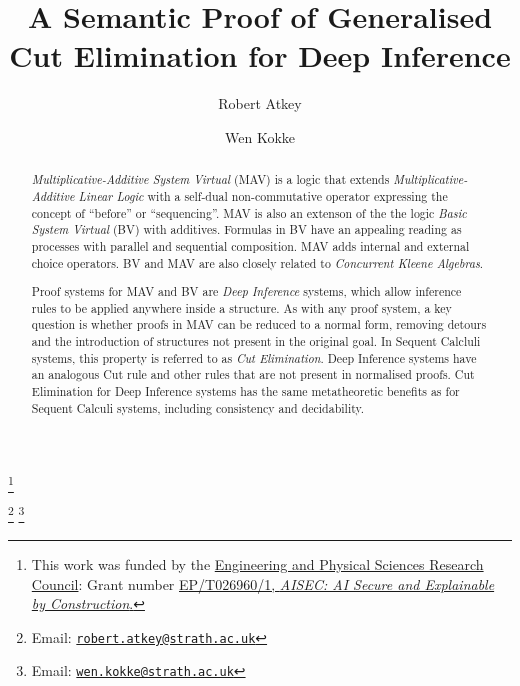 \documentclass[twoside,11pt]{entics}
\begin{document}
\begin{frontmatter}
  \title{A Semantic Proof of Generalised Cut Elimination for Deep Inference}
  \thanks[ALL]{This work
    was funded by the \href{https://www.ukri.org/about-us/epsrc/}{Engineering and Physical
      Sciences Research
      Council}: Grant number
    \href{https://gow.epsrc.ukri.org/NGBOViewGrant.aspx?GrantRef=EP/T026960/1}{EP/T026960/1, \emph{AISEC: AI Secure and
        Explainable by Construction}.}}
  \author{Robert Atkey}
  \author{Wen Kokke}
  \address[msp]{%
    Mathematically Structured Programming Group\\
    Computer and Information Sciences\\
    University of Strathclyde\\
    Glasgow, Scotland, UK}
  \thanks[bobemail]%
  {Email: \href{robert.atkey@strath.ac.uk}%
    {\texttt{\normalshape robert.atkey@strath.ac.uk}}}
  \thanks[wenemail]%
  {Email: \href{wen.kokke@strath.ac.uk}%
    {\texttt{\normalshape wen.kokke@strath.ac.uk}}}
  \begin{abstract}
    \emph{Multiplicative-Additive System Virtual} (MAV) is a logic
    that extends \emph{Multiplicative-Additive Linear Logic} with a
    self-dual non-commutative operator expressing the concept of
    ``before'' or ``sequencing''. MAV is also an extenson of the the
    logic \emph{Basic System Virtual} (BV) with additives. Formulas in
    BV have an appealing reading as processes with parallel and
    sequential composition. MAV adds internal and external choice
    operators. BV and MAV are also closely related to \emph{Concurrent
      Kleene Algebras}.

    \medskip

    Proof systems for MAV and BV
    are \emph{Deep Inference} systems, which allow inference rules to
    be applied anywhere inside a structure.
    As with any proof system, a key question is whether proofs in MAV
    can be reduced to a normal form, removing detours and the
    introduction of structures not present in the original goal. In
    Sequent Calcluli systems, this property is referred to as
    \emph{Cut Elimination}. Deep Inference systems have an analogous
    Cut rule and other rules that are not present in normalised
    proofs. Cut Elimination for Deep Inference systems has the same
    metatheoretic benefits as for Sequent Calculi systems, including
    consistency and decidability.


\end{abstract}
\end{frontmatter}
\end{document}
